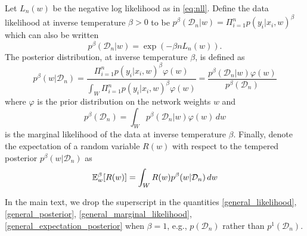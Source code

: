 \documentclass{article} %
\begin{document}
Let $L_n(w)$ be the negative log likelihood as in \eqref{eq:nll}. Define the data likelihood at inverse temperature $\beta >0$ to be $p^\beta(\mathcal D_n | w) = \Pi_{i=1}^n p(y_i |x_i, w)^\beta$ which can also be written 
\begin{equation}
p^\beta(\mathcal D_n | w) = \exp(-\beta n L_n(w)).
\label{general_likelihood}
\end{equation}
The posterior distribution, at inverse temperature $\beta$, is defined as 
\begin{equation}
p^\beta(w|\mathcal D_n) = \frac{\Pi_{i=1}^n p(y_i|x_i,w)^\beta \varphi(w)}{\int_W \Pi_{i=1}^n p(y_i|x_i,w)^\beta \varphi(w)} = \frac{p^\beta(\mathcal D_n|w) \varphi(w)}{p^\beta(\mathcal D_n)}
\label{general_posterior}
\end{equation}
where $\varphi$ is the prior distribution on the network weights $w$ and
\begin{equation}
p^\beta(\mathcal D_n) = \int_W p^\beta(\mathcal D_n|w) \varphi(w) \,dw
\label{general_marginal_likelihood}
\end{equation}
is the marginal likelihood of the data at inverse temperature $\beta$. 
Finally, denote the expectation of a random variable $R(w)$ with respect to the tempered posterior $p^\beta(w|\mathcal D_n)$ as
\begin{equation}
{\mathbb{E}}_w^\beta [R(w)] = \int_W R(w) p^\beta(w|\mathcal D_n) \,dw
\label{general_expectation_posterior}
\end{equation}

In the main text, we drop the superscript in the quantities \ref{general_likelihood}, \ref{general_posterior}, \ref{general_marginal_likelihood}, \ref{general_expectation_posterior} when $\beta = 1$, e.g., $p(\mathcal D_n)$ rather than $p^1(\mathcal D_n)$.
\end{document}
